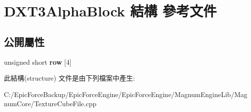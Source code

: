 \hypertarget{struct_d_x_t3_alpha_block}{}\section{D\+X\+T3\+Alpha\+Block 結構 參考文件}
\label{struct_d_x_t3_alpha_block}
\subsection*{公開屬性}
\begin{DoxyCompactItemize}
\item 
unsigned short {\bfseries row} \mbox{[}4\mbox{]}\hypertarget{struct_d_x_t3_alpha_block_a5b7d3dfc7ce5ac6096ecdc05ed2efc58}{}\label{struct_d_x_t3_alpha_block_a5b7d3dfc7ce5ac6096ecdc05ed2efc58}

\end{DoxyCompactItemize}


此結構(structure) 文件是由下列檔案中產生\+:\begin{DoxyCompactItemize}
\item 
C\+:/\+Epic\+Force\+Backup/\+Epic\+Force\+Engine/\+Epic\+Force\+Engine/\+Magnum\+Engine\+Lib/\+Magnum\+Core/Texture\+Cube\+File.\+cpp\end{DoxyCompactItemize}
